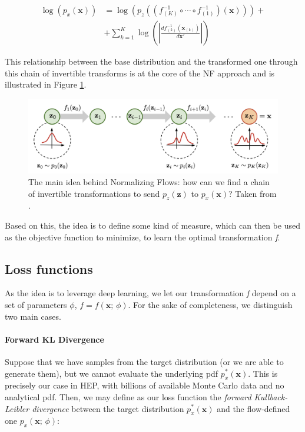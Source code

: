 	\begin{equation*}
		\begin{aligned}
			\log(p_x(\mathbf{x})) &= \log\left(p_z\left(\left(f_{(K)}^{-1}\circ\cdots\circ f_{(1)}^{-1}\right)\left(\mathbf{x}\right)\right)\right)+\\
			&+\sum^{K}_{k=1}\log\left(\left|\frac{df^{-1}_{(k)}(\mathbf{x}_{(k)})}{d\mathbf{x}'}\right|\right)
		\end{aligned}
	\end{equation*}
	
This relationship between the base distribution and the transformed one through this chain of invertible transforms is at the core of the NF approach and is illustrated in Figure \ref{fig:nf}.

\begin{figure}
    \centering
    \includegraphics[width=\columnwidth]{gfx/ch3/normalizing-flow.png}
    \caption[Normalizing Flows]{The main idea behind Normalizing Flows: how can we find a chain of invertible transformations to send $p_z(\mathbf{z})$ to $p_x(\mathbf{x})$? Taken from \cite{nffig}.}
    \label{fig:nf}
\end{figure}
	
Based on this, the idea is to define some kind of measure, which can then be used as the objective function to minimize, to learn the optimal transformation \emph{f}.

\subsection{Loss functions}

As the idea is to leverage deep learning, we let our transformation \emph{f} depend on a set of parameters $\phi$, $f = f(\mathbf{x};\, \phi)$.
For the sake of completeness, we distinguish two main cases.

\paragraph{Forward KL Divergence}
Suppose that we have samples from the target distribution (or we are able to generate them), but we cannot evaluate the underlying pdf $p_x^*(\mathbf{x})$. This is precisely our case in HEP, with billions of available Monte Carlo data and no analytical pdf. Then, we may define as our loss function the \emph{forward Kullback-Leibler divergence} between the target distribution $p_x^*(\mathbf{x})$ and the flow-defined one $p_x(\mathbf{x}; \, \phi)$:

